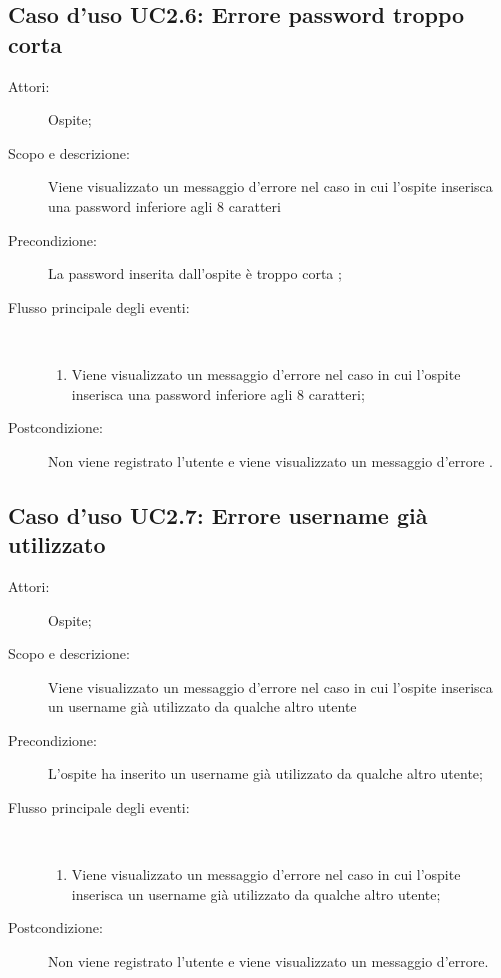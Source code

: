 \subsection{Caso d'uso UC2.6: Errore password troppo corta}\begin{description}
\item[Attori:] Ospite;
\item[Scopo e descrizione:] Viene visualizzato un messaggio d'errore nel caso in cui l'ospite inserisca una password inferiore agli 8 caratteri
      \item[Precondizione:] La password inserita dall'ospite è troppo corta
;

        \item[Flusso principale degli eventi:] \ 
 \begin{enumerate}
          \item Viene visualizzato un messaggio d'errore nel caso in cui l'ospite inserisca una password inferiore agli 8 caratteri;

      \end{enumerate}
    \item[Postcondizione:] Non viene registrato l'utente e viene visualizzato un messaggio d'errore
.
  \end{description}
\hypertarget{UC2.7}{}
\subsection{Caso d'uso UC2.7: Errore username già utilizzato}\begin{description}
\item[Attori:] Ospite;
\item[Scopo e descrizione:] Viene visualizzato un messaggio d'errore nel caso in cui l'ospite inserisca un username già utilizzato da qualche altro utente
      \item[Precondizione:] L'ospite ha inserito un username già utilizzato da qualche altro utente;

        \item[Flusso principale degli eventi:] \ 
 \begin{enumerate}
          \item Viene visualizzato un messaggio d'errore nel caso in cui l'ospite inserisca un username già utilizzato da qualche altro utente;

      \end{enumerate}
    \item[Postcondizione:] Non viene registrato l'utente e viene visualizzato un messaggio d'errore.
  \end{description}
\hypertarget{UC3}{}

